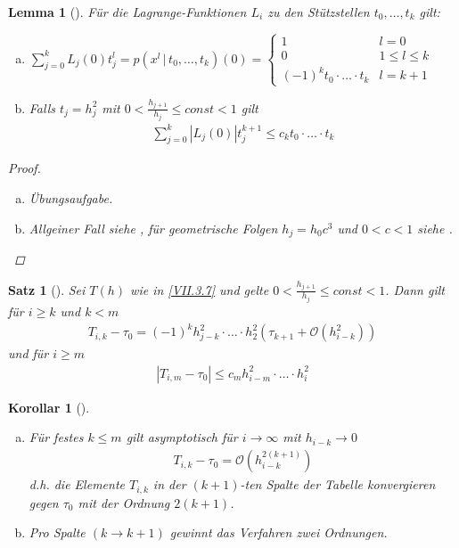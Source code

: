\documentclass[ngerman,fontsize=11pt, paper=a4, parskip=half, titlepage=true, toc=bib]{scrbook}
\theoremstyle{definition}
\theoremstyle{plain}
\newtheorem{Satz}[Def]{Satz}		%
\newtheorem{Lem}[Def]{Lemma}		%
\newtheorem{Kor}[Def]{Korollar}		%
\newenvironment{Satze}[1][]{ %
  \begin{Satz}[#1]  }
  { \end{Satz}
  \addtocounter{subsection}{1}}
\newenvironment{Leme}[1][]{ %
  \begin{Lem}[#1] }
  {\end{Lem}
  \addtocounter{subsection}{1}}
\newenvironment{Kore}[1][]{ %
  \begin{Kor}[#1]}
  {\end{Kor}
  \addtocounter{subsection}{1}}
\begin{document}
\begin{Leme}\label{7.3.8}
  Für die Lagrange-Funktionen $L_i$ 
  zu den Stützstellen $t_0,\ldots, t_k$ gilt:
  \begin{enumerate}[a)]
  \item $\sum_{j=0}^kL_j(0)t_j^l=p(x^l\,|\,t_0,\ldots,t_k)(0)
    =\begin{cases}
      1 &l=0\\
      0&1\leq l\leq k\\
      (-1)^kt_0\cdot\ldots\cdot t_k & l=k+1
    \end{cases}$
  \item Falls $t_j=h_j^2$ mit $0<\frac{h_{j+1}}{h_j}\leq const<1$ gilt
    \begin{gather*}
      \sum_{j=0}^k\left|L_j(0)\right|t_j^{k+1}\leq
      c_kt_0\cdot\ldots\cdot t_k
    \end{gather*}
  \end{enumerate}
  \begin{proof}~
    \begin{enumerate}[a)]
    \item Übungsaufgabe.
    \item Allgeiner Fall siehe \cite{stoerbulirsch},
      für geometrische Folgen $h_j=h_0c^3$ und $0<c<1$ siehe
      \cite{stoer}. 
    \end{enumerate}
  \end{proof}
\end{Leme}

\begin{Satze}\label{7.3.9}
  Sei $T(h)$ wie in \eqref{VII.3.7}
  und gelte $0<\frac{h_{j+1}}{h_j}\leq const<1$.
  Dann gilt für $i\geq k$ und $k<m$
  \begin{gather}
    T_{i,k}-\tau_0=(-1)^kh_{j-k}^2\cdot\ldots
    \cdot h_2^2\left(\tau_{k+1}+\mathcal{O}(h_{i-k}^2)\right)
    \label{VII.3.11}
  \end{gather}
  und für $i\geq m$
  \begin{gather}
    \left| T_{i,m}-\tau_0 \right| \leq c_mh_{i-m}^2\cdot\ldots \cdot h_i^2
    \label{VII.3.12}
  \end{gather}
\end{Satze}

\begin{Kore}~
  \begin{enumerate}[a)]
  \item Für festes $k\leq m $ gilt asymptotisch 
    für $i\longrightarrow \infty$ mit $h_{i-k}\longrightarrow 0$
    \begin{gather}
      T_{i,k}-\tau_0 = \mathcal{O}\left(h_{i-k}^{2(k+1)}\right)
      \label{VII.3.13}
    \end{gather}
    d.h. die Elemente $T_{i,k}$ in der $(k+1)$-ten Spalte der Tabelle
    konvergieren gegen $\tau_0$ mit der Ordnung $2(k+1)$.
  \item Pro Spalte $(k \rightarrow k+1)$ 
    gewinnt das Verfahren zwei Ordnungen.
  \end{enumerate}

\end{Kore}
\end{document}
